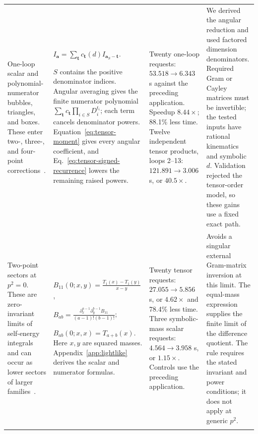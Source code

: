 \begin{landscape}
\begin{longtable}{@{}>{\raggedright\arraybackslash}p{3.9cm}>{\raggedright\arraybackslash}p{8.0cm}>{\raggedright\arraybackslash}p{5.1cm}>{\raggedright\arraybackslash}p{6.2cm}@{}}
One-loop scalar and polynomial-numerator bubbles, triangles, and boxes. These enter two-, three-, and four-point corrections~\cite{DennerDittmaier2006}.
& $\displaystyle I_{\boldsymbol a}=\sum_{\boldsymbol t}c_{\boldsymbol t}(d)I_{\boldsymbol a_S-\boldsymbol t}$.
\par $S$ contains the positive denominator indices. Angular averaging gives the finite numerator polynomial $\sum_{\boldsymbol t}c_{\boldsymbol t}\prod_{i\in S}D_i^{t_i}$; each term cancels denominator powers. Equation~\eqref{eq:tensor-moment} gives every angular coefficient, and Eq.~\eqref{eq:tensor-signed-recurrence} lowers the remaining raised powers.
& Twenty one-loop requests: $53.518\to6.343$ s against the preceding application. Speedup $8.44\times$; 88.1\% less time. Twelve independent tensor products, loops 2--13: $121.891\to3.006$ s, or $40.5\times$.
& We derived the angular reduction and used factored dimension denominators. Required Gram or Cayley matrices must be invertible; the tested inputs have rational kinematics and symbolic $d$. Validation rejected the tensor-order model, so these gains use a fixed exact path.\\\addlinespace[7pt]

Two-point sectors at $p^2=0$. These are zero-invariant limits of self-energy integrals and can occur as lower sectors of larger families~\cite{Weinzierl2022}.
& $\displaystyle B_{11}(0;x,y)=\frac{T_1(x)-T_1(y)}{x-y}$,
\par $\displaystyle B_{ab}=\frac{\partial_x^{a-1}\partial_y^{b-1}B_{11}}{(a-1)!(b-1)!}$;
\par $B_{ab}(0;x,x)=T_{a+b}(x)$. Here $x,y$ are squared masses. Appendix~\ref{app:lightlike} derives the scalar and numerator formulas.
& Twenty tensor requests: $27.055\to5.856$ s, or $4.62\times$ and 78.4\% less time. Three symbolic-mass scalar requests: $4.564\to3.958$ s, or $1.15\times$. Controls use the preceding application.
& Avoids a singular external Gram-matrix inversion at this limit. The equal-mass expression supplies the finite limit of the difference quotient. The rule requires the stated invariant and power conditions; it does not apply at generic $p^2$.\\\addlinespace[7pt]


\end{longtable}
\end{landscape}
